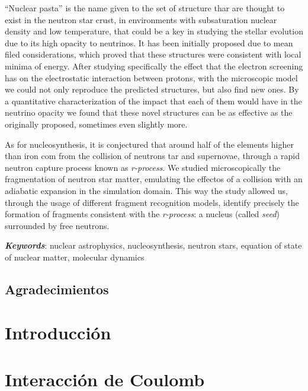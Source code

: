 \documentclass[12pt]{book}
\begin{document}
``Nuclear pasta'' is the name given to the set of structure thar are thought to exist in the neutron star crust, in environments with subsaturation nuclear density and low temperature, that could be a key in studying the stellar evolution due to its high opacity to neutrinos.
It has been initially proposed due to mean filed considerations, which proved that these structures were consistent with local minima of energy.
After studying specifically the effect that the electron screening has on the electrostatic interaction between protons, with the microscopic model we could not only reproduce the predicted structures, but also find new ones.
By a quantitative characterization of the impact that each of them would have in the neutrino opacity we found that these novel structures can be as effective as the originally proposed, sometimes even slightly more.

As for nucleosynthesis, it is conjectured that around half of the elements higher than iron com from the collision of neutrons tar and supernovae, through a rapid neutron capture process known as \emph{r-process}.
We studied microscopically the fragmentation of neutron star matter, emulating the effectos of a collision with an adiabatic expansion in the simulation domain.
This way the study allowed us, through the usage of different fragment recognition models, identify precisely the formation of fragments consistent with the \emph{r-process}: a nucleus (called \emph{seed}) surrounded by free neutrons.

\emph{\textbf{Keywords}}: nuclear astrophysics, nucleosynthesis, neutron stars, equation of state of nuclear matter, molecular dynamics

\newpage

\section*{Agradecimientos}



\tableofcontents
\mainmatter
\chapter[Introducción]{Introducción}
\label{ch:introduccion}



\chapter[Efecto de Coulomb]{Interacción de Coulomb}
\label{ch:coulomb}

\end{document}
